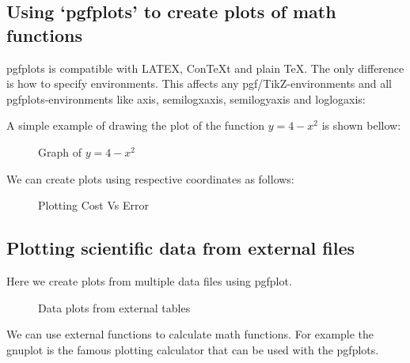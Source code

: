 \documentclass{article}
\begin{document}
\subsection{Using `pgfplots' to create plots of math functions}
pgfplots is compatible with LATEX, ConTeXt and plain \TeX{}. The only difference is how to specify environments. This affects any pgf/TikZ-environments and all pgfplots-environments like axis, semilogxaxis,
semilogyaxis and loglogaxis:

A simple example of drawing the plot of the function $y=4-x^2$ is shown bellow:

\begin{figure}[htp]
    \centering
{} 
\caption{Graph of $y=4-x^2$}
\label{fig:my_label}
\end{figure}

We can create plots using respective coordinates as follows:
\begin{figure}[H]
    \centering
    \caption{Plotting Cost Vs Error}
    \label{fig:my_label}
\end{figure}

\subsection{Plotting scientific data from external files}
Here we create plots from multiple data files using pgfplot.

\begin{figure}[H]
    \centering
    \caption{Data plots from external tables}
    \label{fig:my_label}
\end{figure}
We can use external functions to calculate math functions. For example the gnuplot is the famous plotting calculator that can be used with the pgfplots.
\end{document}

